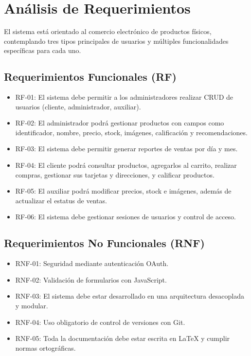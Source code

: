 \section{Análisis de Requerimientos}

El sistema está orientado al comercio electrónico de productos físicos, contemplando tres tipos principales de usuarios y múltiples funcionalidades específicas para cada uno.

\subsection{Requerimientos Funcionales (RF)}
\begin{itemize}
  \item RF-01: El sistema debe permitir a los administradores realizar CRUD de usuarios (cliente, administrador, auxiliar).
  \item RF-02: El administrador podrá gestionar productos con campos como identificador, nombre, precio, stock, imágenes, calificación y recomendaciones.
  \item RF-03: El sistema debe permitir generar reportes de ventas por día y mes.
  \item RF-04: El cliente podrá consultar productos, agregarlos al carrito, realizar compras, gestionar sus tarjetas y direcciones, y calificar productos.
  \item RF-05: El auxiliar podrá modificar precios, stock e imágenes, además de actualizar el estatus de ventas.
  \item RF-06: El sistema debe gestionar sesiones de usuarios y control de acceso.
\end{itemize}

\subsection{Requerimientos No Funcionales (RNF)}
\begin{itemize}
  \item RNF-01: Seguridad mediante autenticación OAuth.
  \item RNF-02: Validación de formularios con JavaScript.
  \item RNF-03: El sistema debe estar desarrollado en una arquitectura desacoplada y modular.
  \item RNF-04: Uso obligatorio de control de versiones con Git.
  \item RNF-05: Toda la documentación debe estar escrita en LaTeX y cumplir normas ortográficas.
\end{itemize}

